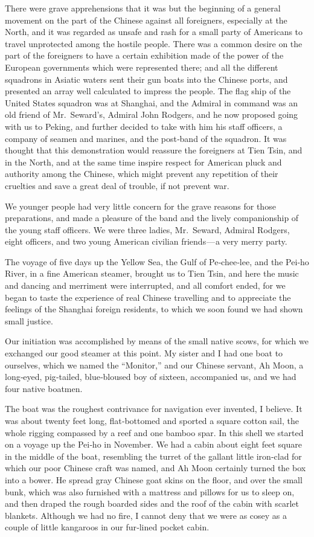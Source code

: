 \documentclass[12pt]{book}
\begin{document}
There were grave apprehensions that it was but the beginning of a general
movement on the part of the Chinese against all foreigners, especially at the
North, and it was regarded as unsafe and rash for a small party of Americans
to travel unprotected among the hostile people. There was a common desire
on the part of the foreigners to have a certain exhibition made of the power of
the European governments which were represented there; and all the different
squadrons in Asiatic waters sent their gun boats into the Chinese ports, and
presented an array well calculated to impress the people. The flag ship of the
United States squadron was at Shanghai, and the Admiral in command was an old
friend of Mr.~Seward’s, Admiral John Rodgers, and he now proposed going with
us to Peking, and further decided to take with him his staff officers, a company of
seamen and marines, and the post‐band of the squadron. It was thought that this
demonstration would reassure the foreigners at Tien Tsin, and in the North, and
at the same time inspire respect for American pluck and authority among the
Chinese, which might prevent any repetition of their cruelties and save a great
deal of trouble, if not prevent war.

We younger people had very little concern for the grave reasons for those
preparations, and made a pleasure of the band and the lively companionship of
the young staff officers. We were three ladies, Mr.~Seward, Admiral Rodgers,
eight officers, and two young American civilian friends — a very merry party.

The voyage of five days up the Yellow Sea, the Gulf of Pe‐chee‐lee, and the
Pei‐ho River, in a fine American steamer, brought us to Tien Tsin, and here the
music and dancing and merriment were interrupted, and all comfort ended, for
we began to taste the experience of real Chinese travelling and to appreciate the
feelings of the Shanghai foreign residents, to which we soon found we had shown
small justice.

Our initiation was accomplished by means of the small native scows, for
which we exchanged our good steamer at this point. My sister and I had one boat
to ourselves, which we named the “Monitor,” and our Chinese servant, Ah Moon,
a long‐eyed, pig‐tailed, blue‐bloused boy of sixteen, accompanied us, and we had
four native boatmen.

The boat was the roughest contrivance for navigation ever invented, I believe.
It was about twenty feet long, flat‐bottomed and sported a square cotton sail, the
whole rigging compassed by a reef and one bamboo spar. In this shell we started
on a voyage up the Pei‐ho in November. We had a cabin about eight feet square
in the middle of the boat, resembling the turret of the gallant little iron‐clad for
which our poor Chinese craft was named, and Ah Moon certainly turned the box
into a bower. He spread gray Chinese goat skins on the floor, and over the small
bunk, which was also furnished with a mattress and pillows for us to sleep on,
and then draped the rough boarded sides and the roof of the cabin with scarlet
blankets. Although we had no fire, I cannot deny that we were as cosey as a
couple of little kangaroos in our fur‐lined pocket cabin.
\end{document}
